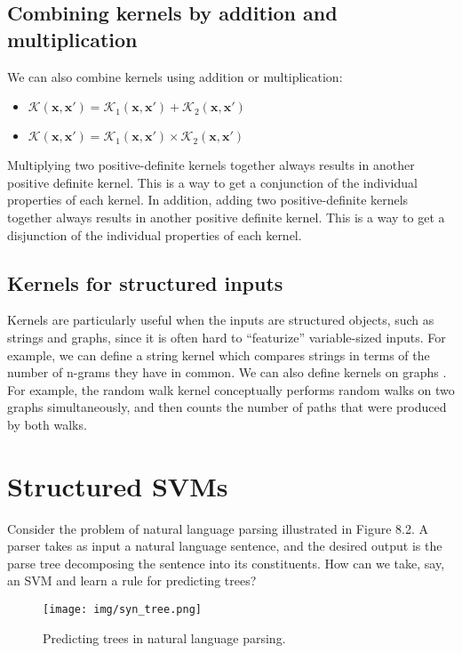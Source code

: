 \documentclass[twoside]{article}
\begin{document}
\subsection{Combining kernels by addition and multiplication}
We can also combine kernels using addition or multiplication:
\begin{itemize}
    \item $\mathcal{K}(\boldsymbol{x}, \boldsymbol{x'}) = \mathcal{K}_1(\boldsymbol{x}, \boldsymbol{x'}) + \mathcal{K}_2(\boldsymbol{x}, \boldsymbol{x'})$
    \item $\mathcal{K}(\boldsymbol{x}, \boldsymbol{x'}) = \mathcal{K}_1(\boldsymbol{x}, \boldsymbol{x'}) \times \mathcal{K}_2(\boldsymbol{x}, \boldsymbol{x'})$
\end{itemize}
Multiplying two positive-definite kernels together always results in another positive definite kernel. This is a way to get a conjunction of the individual properties of each kernel. In addition, adding two positive-definite kernels together always results in another positive definite
kernel. This is a way to get a disjunction of the individual properties of each kernel.
\subsection{Kernels for structured inputs}
Kernels are particularly useful when the inputs are structured objects, such as strings and graphs, since it is often hard to “featurize” variable-sized inputs. For example, we can define a string kernel which compares strings in terms of the number of n-grams they have in common.
We can also define kernels on graphs . For example, the random walk kernel conceptually performs random walks on two graphs simultaneously, and then counts the number of paths that were produced by both walks.



\section{Structured SVMs}
Consider the problem of natural language parsing illustrated in Figure 8.2. A parser takes as input a natural
language sentence, and the desired output is the parse tree
decomposing the sentence into its constituents. How can we take, say,
an SVM and learn a rule for predicting trees?

\begin{figure}[h]
\caption{Predicting trees in natural language parsing.}
\centering
\texttt{[image: img/syn\_tree.png]}
\end{figure}
\end{document}
